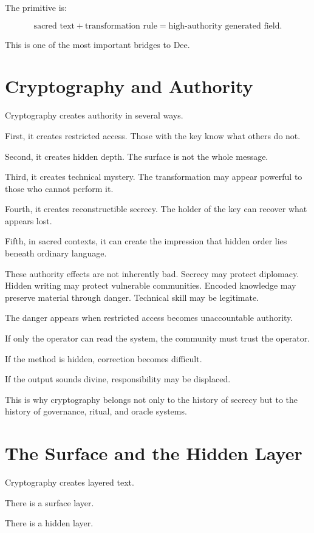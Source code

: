 \documentclass[11pt]{book}
\begin{document}
The primitive is:

\[
\text{sacred text} + \text{transformation rule} = \text{high-authority generated field}.
\]

This is one of the most important bridges to Dee.

\section{Cryptography and Authority}

Cryptography creates authority in several ways.

First, it creates restricted access. Those with the key know what others do not.

Second, it creates hidden depth. The surface is not the whole message.

Third, it creates technical mystery. The transformation may appear powerful to those who cannot perform it.

Fourth, it creates reconstructible secrecy. The holder of the key can recover what appears lost.

Fifth, in sacred contexts, it can create the impression that hidden order lies beneath ordinary language.

These authority effects are not inherently bad. Secrecy may protect diplomacy. Hidden writing may protect vulnerable communities. Encoded knowledge may preserve material through danger. Technical skill may be legitimate.

The danger appears when restricted access becomes unaccountable authority.

If only the operator can read the system, the community must trust the operator.

If the method is hidden, correction becomes difficult.

If the output sounds divine, responsibility may be displaced.

This is why cryptography belongs not only to the history of secrecy but to the history of governance, ritual, and oracle systems.

\section{The Surface and the Hidden Layer}

Cryptography creates layered text.

There is a surface layer.

There is a hidden layer.
\end{document}
